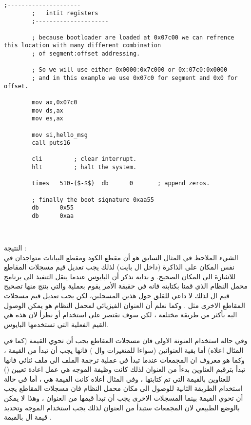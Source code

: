 \documentclass[document.tex]{subfiles}
\begin{document}
\begin{english}
\begin{lstlisting}[label=lst:hello_bootloader,caption=Hello\, World]
		;---------------------
		;	intit registers
		;---------------------
		
		; because bootloader are loaded at 0x07c00 we can refrence this location with many different combination
		; of segment:offset addressing.
		
		; So we will use either 0x0000:0x7c000 or 0x:07c0:0x0000
		; and in this example we use 0x07c0 for segment and 0x0 for offset.
		
		mov ax,0x07c0			
		mov ds,ax
		mov es,ax
		
		mov si,hello_msg
		call puts16

		cli			; clear interrupt.		
		hlt			; halt the system.
		
		times	510-($-$$)	db		0		; append zeros.
		
		; finally the boot signature 0xaa55
		db		0x55
		db		0xaa
		
		
\end{lstlisting}
\end{english}


النتيجة :\\

الشيء الملاحظ في المثال السابق هو أن مقطع الكود  ومقطع البيانات  متواجدان في نفس المكان على الذاكرة (داخل ال  بايت) لذلك يجب تعديل قيم مسجلات المقاطع للاشارة الى المكان الصحيح.
و بداية نذكر أن البايوس عندما ينقل التنفيذ الى برنامج محمل النظام الذي قمنا بكتابته فانه في حقيقة الأمر يقوم بعملية  والتي ينتج منها تصحيح قيم ال  لذلك لا داعي للقلق حول هذين المسجلين، لكن يجب تعديل قيم مسجلات المقاطع الاخرى مثل . وكما نعلم أن العنوان الفيزيائي لمحمل النظام هو  يمكن الوصول اليه بأكثر من  طريقة مختلفة ، لكن سوف نقتصر على استخدام  أو   نظرأ لان هذه هي القيم الفعلية التي تستخدمها البايوس.

وفي حالة استخدام العنونة الاولى فان مسجلات المقاطع يجب أن تحوي القيمة  (كما في المثال اعلاه) أما بقية العنوانين (سواءا للمتغيرات وال ) فانها يجب أن تبدأ من القيمة ، وكما هو معروف ان المجمعات عندما تبدأ في عملية ترجمة الملف الى ملف ثنائي فانها تبدأ بترقيم العناوين بدءأ من العنوان  لذلك كانت وظيفة الموجه  هي عمل اعادة تعيين () للعناوين بالقيمة التي تم كتابتها ، وفي المثال أعلاه كانت القيمة هي  ، أما في حالة استخدام الطريقة الثانية للوصول الى مكان محمل النظام فان مسجلات المقاطع يجب أن تحوي القيمة  بينما المسجلات الاخرى يجب أن تبدأ قيمها من العنوان  ، وهذا لا يمكن بالوضع الطبيعي لان المجمعات ستبدأ من العنوان  لذلك يجب استخدام الموجه  وتحديد قيمة ال  بالقيمة  .
\end{document}
